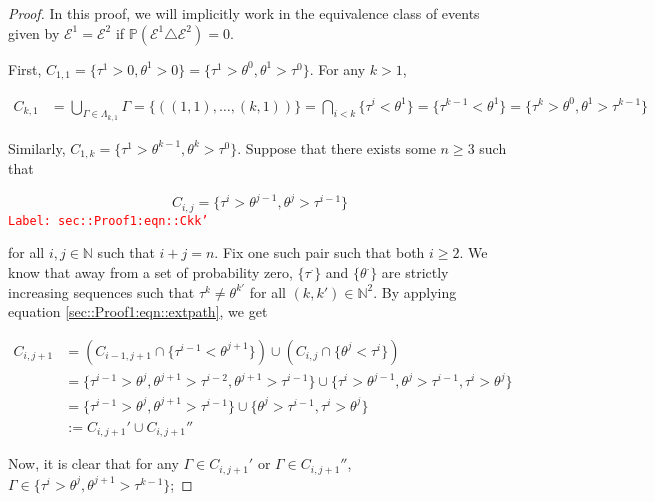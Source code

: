 \documentclass[12pt]{article}
\newcommand{\mb}{\mathbb}
\newcommand{\mc}{\mathcal}
\newcommand{\tr}{\textcolor{red}}
\newcommand{\labe}[1]{\tr{\texttt{Label: #1}}}
\newcommand{\ind}{\hspace{24pt}}
\newcommand{\pr}{\mb{P}}							%
\newcommand{\rt}[1]{\tau^{#1}}						%
\newcommand{\rtt}[1]{\theta^{#1}}					%
\renewcommand{\it}{k}								%
\newcommand{\itt}{i}								%
\newcommand{\ittt}{j}								%
\newcommand{\numb}{n}								%
\newcommand{\apath}{\Gamma}						%
\newcommand{\pathset}[2]{\Lambda_{#1,#2}}			%
\newcommand{\pathsete}[2]{C_{#1,#2}}			%
\newcommand{\evnt}{\mc{E}}						%
\begin{document}
\begin{proof}
In this proof, we will implicitly work in the equivalence class of events given by \(\evnt^1 = \evnt^2\) if \(\pr(\evnt^1 \triangle \evnt^2) = 0\).  

\ind First, \(\pathsete{1}{1} = \{\rt{1} > 0,\rtt{1} > 0\} = \{\rt{1} > \rtt{0},\rtt{1}>\rt{0}\}\). For any \(\it > 1\),

\begin{align*}
\pathsete{\it}{1} &= \bigcup_{\apath \in \pathset{\it}{1}} \apath = \{((1,1),\dots,(\it,1))\} = \bigcap_{\itt < \it} \{\rt{\itt} < \rtt{1}\} = \{\rt{\it-1} < \rtt{1}\} = \{\rt{\it} > \rtt{0},\rtt{1} > \rt{\it-1}\}
\end{align*}

Similarly, \(\pathsete{1}{\it} = \{\rt{1} > \rtt{\it-1}, \rtt{\it} > \rt{0}\}\). Suppose that there exists some \(\numb\geq 3\) such that

\begin{equation}
\pathsete{\itt}{\ittt} = \{\rt{\itt} > \rtt{\ittt-1},\rtt{\ittt} > \rt{\itt-1}\}
\label{sec::Proof1:eqn::Ckk'}
\end{equation}
\labe{sec::Proof1:eqn::Ckk'}

for all \(\itt, \ittt\in \mb{N}\) such that \(\itt+\ittt = \numb\). Fix one such pair such that both \(\itt \geq 2\). We know that away from a set of probability zero, \(\{\rt{\cdot}\}\) and \(\{\rtt{\cdot}\}\) are strictly increasing sequences such that \(\rt{\it} \neq \rtt{\it'}\) for all \((\it,\it')\in \mb{N}^2\). By applying equation \eqref{sec::Proof1:eqn::extpath}, we get

\begin{align*}
\pathsete{\itt}{\ittt+1} &= \left(\pathsete{\itt-1}{\ittt+1} \cap \{\rt{\itt - 1} < \rtt{\ittt+1}\}\right) \cup \left(\pathsete{\itt}{\ittt}\cap \{\rtt{\ittt} < \rt{\itt}\}\right)\\
&= \{\rt{\itt - 1} > \rtt{\ittt}, \rtt{\ittt+1} > \rt{\itt - 2},  \rtt{\ittt+1} > \rt{\itt -1}\}\cup\{\rt{\itt} > \rtt{\ittt-1}, \rtt{\ittt} > \rt{\itt - 1},\rt{\itt} > \rtt{\ittt}\}\\
&= \{\rt{\itt - 1} > \rtt{\ittt}, \rtt{\ittt+1} > \rt{\itt - 1}\}\cup\{\rtt{\ittt} > \rt{\itt - 1},\rt{\itt} > \rtt{\ittt}\}\\
&:= \pathsete{\itt}{\ittt+1}' \cup\pathsete{\itt}{\ittt+1}''
\end{align*}

Now, it is clear that for any \(\apath \in \pathsete{\itt}{\ittt+1}'\) or \(\apath \in \pathsete{\itt}{\ittt+1}''\), \(\apath\in \{\rt{\itt} > \rtt{\ittt},\rtt{\ittt+1} > \rt{\it-1}\}\);


\end{proof}
\end{document}
